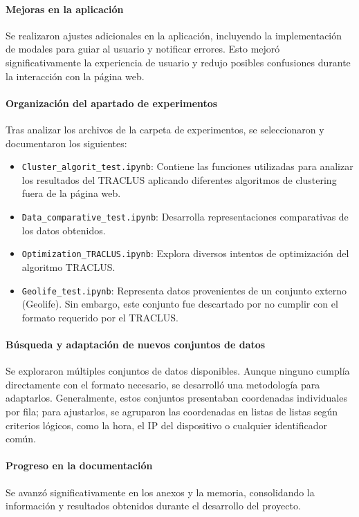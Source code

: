\paragraph{Mejoras en la aplicación}
Se realizaron ajustes adicionales en la aplicación, incluyendo la implementación de modales para guiar al usuario y notificar errores. Esto mejoró significativamente la experiencia de usuario y redujo posibles confusiones durante la interacción con la página web.

\paragraph{Organización del apartado de experimentos}
Tras analizar los archivos de la carpeta de experimentos, se seleccionaron y documentaron los siguientes:
\begin{itemize}
    \item \texttt{Cluster\_algorit\_test.ipynb}: Contiene las funciones utilizadas para analizar los resultados del TRACLUS aplicando diferentes algoritmos de clustering fuera de la página web.
    \item \texttt{Data\_comparative\_test.ipynb}: Desarrolla representaciones comparativas de los datos obtenidos.
    \item \texttt{Optimization\_TRACLUS.ipynb}: Explora diversos intentos de optimización del algoritmo TRACLUS.
    \item \texttt{Geolife\_test.ipynb}: Representa datos provenientes de un conjunto externo (Geolife). Sin embargo, este conjunto fue descartado por no cumplir con el formato requerido por el TRACLUS.
\end{itemize}

\paragraph{Búsqueda y adaptación de nuevos conjuntos de datos}
Se exploraron múltiples conjuntos de datos disponibles. Aunque ninguno cumplía directamente con el formato necesario, se desarrolló una metodología para adaptarlos. Generalmente, estos conjuntos presentaban coordenadas individuales por fila; para ajustarlos, se agruparon las coordenadas en listas de listas según criterios lógicos, como la hora, el IP del dispositivo o cualquier identificador común.

\paragraph{Progreso en la documentación}
Se avanzó significativamente en los anexos y la memoria, consolidando la información y resultados obtenidos durante el desarrollo del proyecto.

